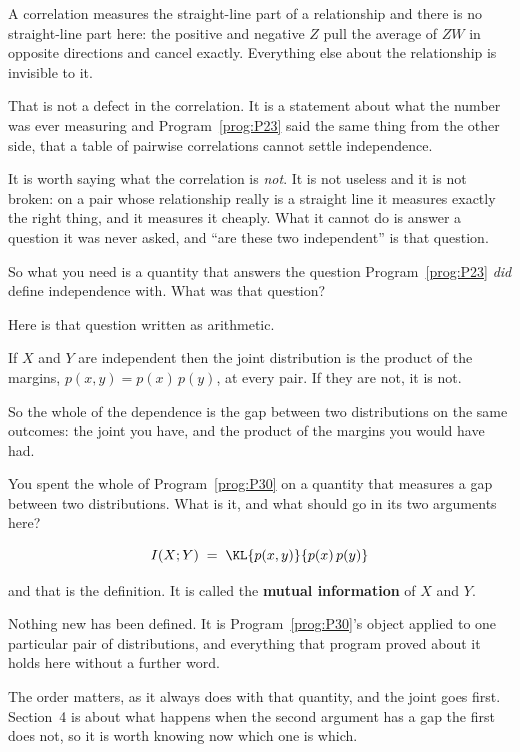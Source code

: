 \begin{fr}

A correlation measures the straight-line part of a relationship and there is
no straight-line part here: the positive and negative $Z$ pull the average of
$ZW$ in opposite directions and cancel exactly. Everything else about the
relationship is invisible to it.

That is not a defect in the correlation. It is a statement about what the
number was ever measuring \dash{} and Program~\ref{prog:P23} said the same
thing from the other side, that a table of pairwise correlations cannot
settle independence.

It is worth saying what the correlation is \emph{not}. It is not useless and
it is not broken: on a pair whose relationship really is a straight line it
measures exactly the right thing, and it measures it cheaply. What it cannot
do is answer a question it was never asked, and \enquote{are these two
independent} is that question.

So what you need is a quantity that answers the question
Program~\ref{prog:P23} \emph{did} define independence with. What was that
question?
\dotline
\nextframe
\end{fr}

\begin{fr}

Here is that question written as arithmetic.

If $X$ and $Y$ are independent then the joint distribution is the product of
the margins, $p(x, y) = p(x)\,p(y)$, at every pair. If they are not, it is
not.

So the whole of the dependence is the gap between two distributions on the
same outcomes: the joint you have, and the product of the margins you would
have had.

You spent the whole of Program~\ref{prog:P30} on a quantity that measures a
gap between two distributions. What is it, and what should go in its two
arguments here?
\dotline
\nextframe
\end{fr}

\begin{fr}

\[ I(X; Y) \;=\; \KL{p(x, y)}{p(x)\,p(y)} \]

and that is the definition. It is called the \textbf{mutual information} of
$X$ and $Y$.

Nothing new has been defined. It is Program~\ref{prog:P30}'s object applied
to one particular pair of distributions, and everything that program proved
about it holds here without a further word.

\begin{note}
The order matters, as it always does with that quantity, and the joint goes
first. Section~4 is about what happens when the second argument has a gap the
first does not, so it is worth knowing now which one is which.
\end{note}
\end{fr}

